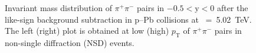 \label{sec:ana}
\begin{figure}[hbt!]
	\centering
	\caption{ Invariant mass distribution of $\pi^{+}\pi^{-}$ pairs in $-0.5<\mathrm{y}<0$ after the like-sign background subtraction in p--Pb collisions at \snn~=~5.02~TeV. The left (right) plot is obtained at low (high) $p_{\mathrm{T}}$ of $\pi^{+}\pi^{-}$ pairs in non-single diffraction (NSD) events. }
	\label{fig:SigExt}
\end{figure}

